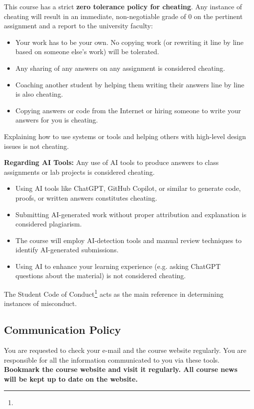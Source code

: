 \documentclass[10pt,a4paper,american]{exam}
\begin{document}
This course has a strict \textbf{zero tolerance policy for cheating}. Any instance of cheating will result in an immediate, non-negotiable grade of 0 on the pertinent assignment and a report to the university faculty:
\begin{itemize}
	\item Your work has to be your own. No copying work (or rewriting it line by line based on someone else's work) will be tolerated.
	\item Any sharing of any answers on any assignment is considered cheating.
	\item Coaching another student by helping them writing their answers line by line is also cheating.
	\item Copying answers or code from the Internet or hiring someone to write your answers for you is cheating.
\end{itemize}

Explaining how to use systems or tools and helping others with high-level design issues is not cheating.

\textbf{Regarding AI Tools:} Any use of AI tools to produce answers to class assignments or lab projects is considered cheating.
\begin{itemize}
	\item Using AI tools like ChatGPT, GitHub Copilot, or similar to generate code, proofs, or written answers constitutes cheating.
	\item Submitting AI-generated work without proper attribution and explanation is considered plagiarism.
	\item The course will employ AI-detection tools and manual review techniques to identify AI-generated submissions.
	\item Using AI to enhance your learning experience (e.g. asking ChatGPT questions about the material) is not considered cheating.
\end{itemize}

The Student Code of Conduct\footnote{\urlcodeofconduct} acts as the main reference in determining instances of misconduct.

\subsection{Communication Policy}
You are requested to check your e-mail and the course website regularly. You are responsible for all the information communicated to you via these tools. \textbf{Bookmark the course website and visit it regularly. All course news will be kept up to date on the website.}
\end{document}
